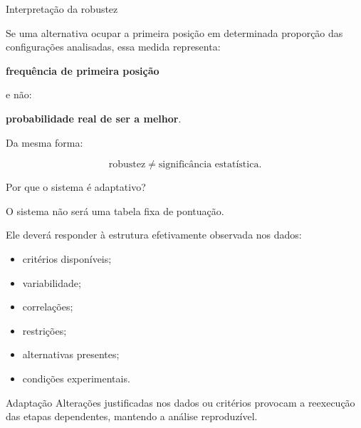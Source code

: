 
\begin{frame}{Interpretação da robustez}

    Se uma alternativa ocupar a primeira posição em determinada
    proporção das configurações analisadas, essa medida representa:

    \begin{center}
        \textbf{frequência de primeira posição}
    \end{center}

    e não:

    \begin{center}
        \textbf{probabilidade real de ser a melhor}.
    \end{center}

    \vspace{0.4cm}

    Da mesma forma:

    \[
    \text{robustez}
    \neq
    \text{significância estatística}.
    \]

\end{frame}



\begin{frame}{Por que o sistema é adaptativo?}

    O sistema não será uma tabela fixa de pontuação.

    \vspace{0.3cm}

    Ele deverá responder à estrutura efetivamente observada nos dados:

    \begin{itemize}
        \item critérios disponíveis;
        \item variabilidade;
        \item correlações;
        \item restrições;
        \item alternativas presentes;
        \item condições experimentais.
    \end{itemize}

    \vspace{0.3cm}

    \begin{block}{Adaptação}
        Alterações justificadas nos dados ou critérios provocam a
        reexecução das etapas dependentes, mantendo a análise
        reproduzível.
    \end{block}

\end{frame}


